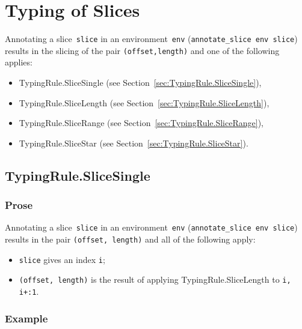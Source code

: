 \documentclass{book}
\begin{document}

\chapter{Typing of Slices \label{ch:typingslices}}

Annotating a slice~\texttt{slice} in an environment~\texttt{env}
(\texttt{annotate\_slice env slice}) results in the slicing of the pair \texttt{(offset,length)} and one of the following applies:
\begin{itemize}
\item TypingRule.SliceSingle (see Section~\ref{sec:TypingRule.SliceSingle}),
\item TypingRule.SliceLength (see Section~\ref{sec:TypingRule.SliceLength}),
\item TypingRule.SliceRange (see Section~\ref{sec:TypingRule.SliceRange}),
\item TypingRule.SliceStar (see Section~\ref{sec:TypingRule.SliceStar}).
\end{itemize}

\section{TypingRule.SliceSingle \label{sec:TypingRule.SliceSingle}}

  \subsection{Prose}
   Annotating a slice~\texttt{slice} in an environment~\texttt{env}
(\texttt{annotate\_slice env slice}) results in the pair \texttt{(offset,
length)} and all of the following apply:
   \begin{itemize}
   \item \texttt{slice} gives an index \texttt{i};
   \item \texttt{(offset, length)} is the result of applying TypingRule.SliceLength to \texttt{i, i+:1}.
   \end{itemize}

  \subsection{Example}
\end{document}
